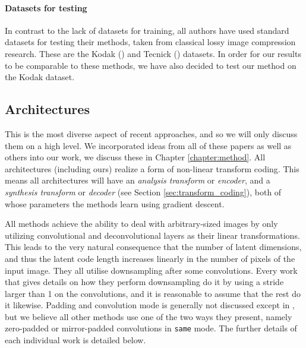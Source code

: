 \paragraph{Datasets for testing}
In contrast to the lack of datasets for training, all authors have used standard
datasets for testing their methods, taken from classical lossy image
compression research. These are the Kodak (\cite{kodakdataset}) and Tecnick
(\cite{asuni2014testimages}) datasets. In order for our results to be comparable
to these methods, we have also decided to test our method on the Kodak dataset.

\subsection{Architectures}
\par
This is the most diverse aspect of recent approaches, and so we will only
discuss them on a high level. We incorporated ideas from all of these papers
as well as others into our work, we discuss these in Chapter \ref{chapter:method}. All
architectures (including ours) realize a form of non-linear transform
coding. This means all architectures will have an \textit{analysis transform} or
\textit{encoder}, and a \textit{synthesis transform} or \textit{decoder} (see
Section \ref{sec:transform_coding}), both of whose parameters the methods learn
using gradient descent.
\par
All methods
achieve the ability to deal with arbitrary-sized images by only utilizing
convolutional and deconvolutional layers as their linear transformations. This
leads to the very natural consequence that the number of latent dimensions, and
thus the latent code length increases linearly in the number of pixels of the
input image. They all utilise downsampling after some convolutions.
Every work that gives details
on how they perform downsampling do it by using a stride larger than 1 on the
convolutions, and it is reasonable to assume that the rest do it likewise.
Padding and convolution mode is generally not discussed except in
\cite{theis2017lossy}, but we believe all other methods use one of the two ways
they present, namely zero-padded or mirror-padded convolutions in \texttt{same}
mode. The further details of each individual work is detailed below.

